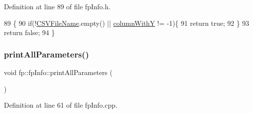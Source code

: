 Definition at line 89 of file fp\+Info.\+h.


\begin{DoxyCode}
89                                          \{
90                 \textcolor{keywordflow}{if}(!\hyperlink{classfp_1_1fpInfo_aac01e5ddb27bc333e172a0422066af1c}{CSVFileName}.empty() || \hyperlink{classfp_1_1fpInfo_ac29e135cd84cdef547b678e7ea37f92d}{columnWithY} != -1)\{
91                     \textcolor{keywordflow}{return} \textcolor{keyword}{true};
92                 \}
93                 \textcolor{keywordflow}{return} \textcolor{keyword}{false};
94             \}
\end{DoxyCode}
\mbox{\label{classfp_1_1fpInfo_a471bd46c828547d5b556f6f4e9fca70f}} 
\subsubsection{\texorpdfstring{print\+All\+Parameters()}{printAllParameters()}}
{\footnotesize\ttfamily void fp\+::fp\+Info\+::print\+All\+Parameters (\begin{DoxyParamCaption}{ }\end{DoxyParamCaption})}



Definition at line 61 of file fp\+Info.\+cpp.


